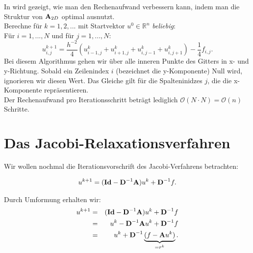 In \cite[S. 21]{ALO02} wird gezeigt, wie man den Rechenaufwand verbessern kann, indem man die Struktur von ${\textbf{A}}_{2D}$ optimal ausnutzt.\\
Berechne für $k = 1,2,...$ mit Startvektor $u^{0} \in \mathbb{R}^{n}$ \textit{beliebig}:\\
Für $i = 1,...,N$ und für $j = 1,...,N$:
\begin{equation}
u^{k+1}_{i,j} = \frac{h^{-2}}{4} (u^{k}_{i-1,j} + u^{k}_{i+1,j} + u^{k}_{i,j-1} + u^{k}_{i,j+1}) - \frac{1}{4} f_{i,j}.
\end{equation}
Bei diesem Algorithmus gehen wir über alle inneren Punkte des Gitters in x- und y-Richtung. Sobald ein Zeilenindex $i$ (bezeichnet die y-Komponente) Null wird, ignorieren wir diesen Wert. Das Gleiche gilt für die Spalteninidzes $j$, die die x-Komponente repräsentieren.\\
Der Rechenaufwand pro Iterationsschritt beträgt lediglich $\mathcal{O}(N \cdot N)=\mathcal{O}(n)$ Schritte.

\section{Das Jacobi-Relaxationsverfahren}\label{s.Jacobi Relaxation}

Wir wollen nochmal die Iterationsvorschrift des Jacobi-Verfahrens betrachten:

\begin{equation}
u^{k+1} = ({\textbf{Id}} - {\textbf{D}}^{-1}{\textbf{A}})u^{k} + {\textbf{D}}^{-1}f.
\end{equation}

Durch Umformung erhalten wir:
\begin{eqnarray}
u^{k+1} &=& ({\textbf{Id}} - {\textbf{D}}^{-1}{\textbf{A}})u^{k} + {\textbf{D}}^{-1}f \notag \\
&=& u^{k} - {\textbf{D}}^{-1}{\textbf{A}}u^{k} + {\textbf{D}}^{-1}f \notag \\
&=& u^{k} + {\textbf{D}}^{-1} \underbrace{(f - {\textbf{A}}u^{k})}_{= r^{k}}.
\end{eqnarray}

